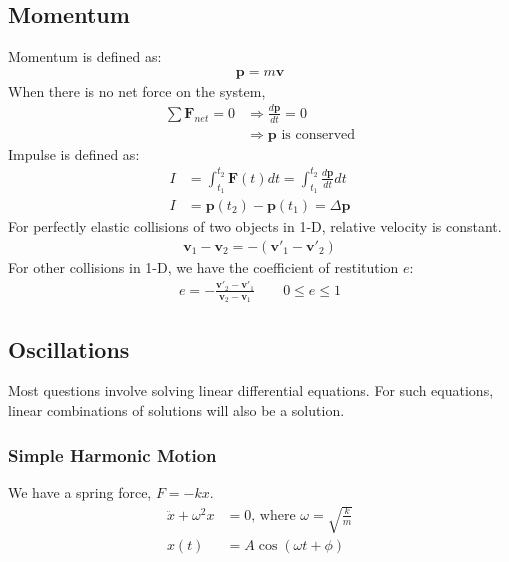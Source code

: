 \documentclass[11pt]{article}
\newcommand{\ve}[1]{\ensuremath{\boldsymbol{#1}}}
\begin{document}
\begin{multicols*}{3}
\subsection{Momentum}
Momentum is defined as:
	\begin{align*}
	\ve{p} = m \ve{v}
	\end{align*}
When there is no net force on the system,
	\begin{align*}
	\sum \ve{F}_{net} = 0 &\Rightarrow \frac{d\ve{p}}{dt} = 0 \\
	&\Rightarrow \ve{p} \text{ is conserved}
	\end{align*}
Impulse is defined as:
	\begin{align*}
	I &= \int_{t_1}^{t_2} \ve{F}(t) dt = \int_{t_1}^{t_2} \frac{d\ve{p}}{dt} dt \\
	I &= \ve{p}(t_2) - \ve{p}(t_1) = \Delta \ve{p}
	\end{align*}
For perfectly elastic collisions of two objects in 1-D, relative velocity is constant. 
	\begin{align*}
	\ve{v}_1 - \ve{v}_2 = - (\ve{v}'_1 - \ve{v}'_2)
	\end{align*}
For other collisions in 1-D, we have the coefficient of restitution $e$:
	\begin{align*}
	e = -\frac{\ve{v}'_2 - \ve{v}'_1}{\ve{v}_2 - \ve{v}_1} \qquad 0 \leq e \leq  1
	\end{align*}
\subsection{Oscillations}
Most questions involve solving linear differential equations. For such equations, linear combinations of solutions will also be a solution.
\subsubsection*{Simple Harmonic Motion}
We have a spring force, $F=-kx$.
	\begin{align*}
	\ddot{x}+\omega^2x&=0 \text{, where }\omega=\sqrt{\frac{k}{m}}\\
	x(t)&=A \cos(\omega t+\phi)
	\end{align*}

\end{multicols*}
\end{document}
